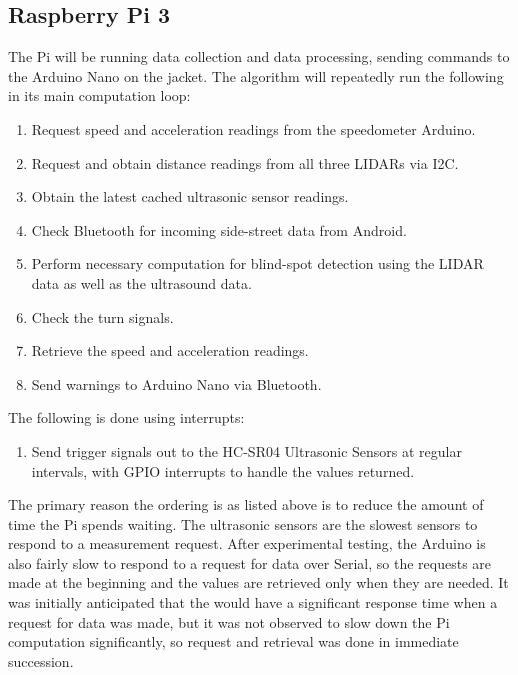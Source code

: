 \documentclass[journal]{IEEEtran}
\begin{document}
\subsection{Raspberry Pi 3}
The Pi will be running data collection and data processing, sending commands to the Arduino Nano on the jacket. The algorithm will repeatedly run the following in its main computation loop:
\begin{enumerate}
    \item Request speed and acceleration readings from the speedometer Arduino.
    \item Request and obtain distance readings from all three LIDARs via I2C.
    \item Obtain the latest cached ultrasonic sensor readings.
    \item Check Bluetooth for incoming side-street data from Android.
    \item Perform necessary computation for blind-spot detection using the LIDAR data as well as the ultrasound data.
    \item Check the turn signals.
    \item Retrieve the speed and acceleration readings.
    \item Send warnings to Arduino Nano via Bluetooth.
\end{enumerate}

The following is done using interrupts:
\begin{enumerate}
    \item Send trigger signals out to the HC-SR04 Ultrasonic Sensors at regular intervals, with GPIO interrupts to handle the values returned.
\end{enumerate}

The primary reason the ordering is as listed above is to reduce the amount of time the Pi spends waiting. The ultrasonic sensors are the slowest sensors to respond to a measurement request. After experimental testing, the Arduino is also fairly slow to respond to a request for data over Serial, so the requests are made at the beginning and the values are retrieved only when they are needed. It was initially anticipated that the \lidar{} would have a significant response time when a request for data was made, but it was not observed to slow down the Pi computation significantly, so request and retrieval was done in immediate succession.
\end{document}
